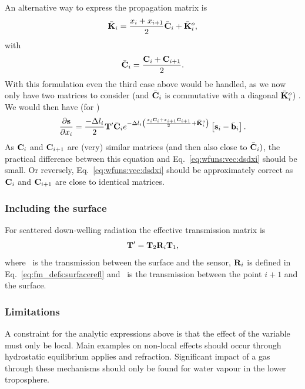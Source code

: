 An alternative way to express the propagation matrix is
\begin{displaymath}
  \bar{{\bf K}}_i = \frac{x_{i}+x_{i+1}}{2}\bar{\mathbf{C}}_i + 
   \bar{{\bf K}}_i^o,   
\end{displaymath}
with
\begin{displaymath}
  \bar{\mathbf{C}}_i = \frac{\mathbf{C}_i+\mathbf{C}_{i+1}}{2}.   
\end{displaymath}
With this formulation even the third case above would be handled, as we now
only have two matrices to consider (and $\bar{\mathbf{C}}_i$ is commutative
with a diagonal $\bar{{\bf K}}_i^o$) . We would then have (for )
\begin{displaymath}
  \frac{\partial{\bf s}}{\partial x_{i}} =  
  \frac{-\Delta l_{i}}{2} \mathbf{T}' \bar{\mathbf{C}}_i
  e^{-\Delta l_{i}\left(\frac{x_{i}\mathbf{C}_i+
            x_{i+1}\mathbf{C}_{i+1}}{2} + \bar{{\bf K}}_i^o \right)}
   \left[ {\bf s}_{i}-\bar{{\bf b}}_i\right]. \nonumber    
\end{displaymath}
As $\mathbf{C}_i$ and $\mathbf{C}_{i+1}$ are (very) similar matrices (and then
also close to $\bar{\mathbf{C}}_i)$, the practical difference between this
equation and Eq.~\ref{eq:wfuns:vec:dsdxi} should be small. Or reversely,
Eq.~\ref{eq:wfuns:vec:dsdxi} should be approximately correct as $\mathbf{C}_i$
and $\mathbf{C}_{i+1}$ are close to identical matrices.


\subsubsection{Including the surface}
%
For scattered down-welling radiation the effective transmission
matrix is
\begin{equation}
  \mathbf{T}' = \mathbf{T}_{2}\mathbf{R}_i\mathbf{T}_{1},
\end{equation}
where \ is the transmission between the surface and the sensor,
$\mathbf{R}_i$ is defined in Eq.~\ref{eq:fm_defs:surfacerefl} and
\ is the transmission between the point $i+1$ and the surface.


\subsubsection{Limitations}
%
A constraint for the analytic expressions above is that the effect of the
variable must only be local. Main examples on non-local effects should occur
through hydrostatic equilibrium applies and refraction. Significant impact of a
gas through these mechanisms should only be found for water vapour in the
lower troposphere.





